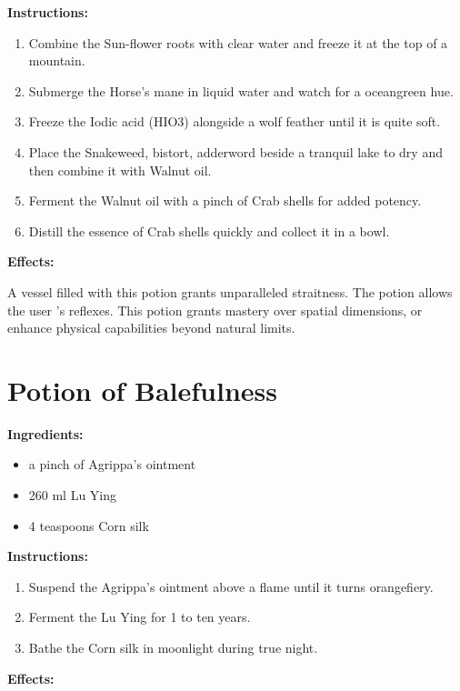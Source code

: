 \documentclass{article}
\begin{document}
\textbf{Instructions:}

\begin{enumerate}
  \item Combine the Sun-flower roots with clear water and freeze it at the top of a mountain.
  \item Submerge the Horse's mane in liquid water and watch for a oceangreen hue.
  \item Freeze the Iodic acid  (HIO3) alongside a wolf feather until it is quite soft.
  \item Place the Snakeweed, bistort, adderword beside a tranquil lake to dry and then combine it with Walnut oil.
  \item Ferment the Walnut oil with a pinch of Crab shells for added potency.
  \item Distill the essence of Crab shells quickly and collect it in a bowl.
\end{enumerate}

\textbf{Effects:}

A vessel filled with this potion grants unparalleled straitness. The potion allows the user 's reflexes. This potion grants mastery over spatial dimensions, or enhance physical capabilities beyond natural limits.

\newpage
\section*{Potion of Balefulness}

\textbf{Ingredients:}

\begin{itemize}
  \item a pinch of Agrippa's ointment
  \item 260 ml Lu Ying
  \item 4 teaspoons Corn silk
\end{itemize}

\textbf{Instructions:}

\begin{enumerate}
  \item Suspend the Agrippa's ointment above a flame until it turns orangefiery.
  \item Ferment the Lu Ying for 1 to ten years.
  \item Bathe the Corn silk in moonlight during true night.
\end{enumerate}

\textbf{Effects:}
\end{document}
